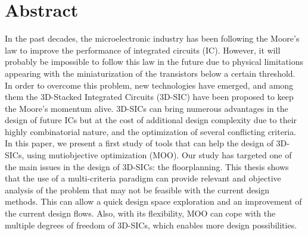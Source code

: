 \chapter{Abstract}

In the past decades, the microelectronic industry has been following the Moore's law to improve the performance of integrated circuits (IC). However, it will probably be impossible to follow this law in the future due to physical limitations appearing with the miniaturization of the transistors below a certain threshold. In order to overcome this problem, new technologies have emerged, and among them the 3D-Stacked Integrated Circuits (3D-SIC) have been proposed to keep the Moore's momentum alive. 3D-SICs can bring numerous advantages in the design of future ICs but at the cost of additional design complexity due to their highly combinatorial nature, and the optimization of several conflicting criteria. In this paper, we present a first study of tools that can help the design of 3D-SICs, using mutiobjective optimization (MOO). Our study has targeted one of the main issues in the design of 3D-SICs: the floorplanning. This thesis shows that the use of a multi-criteria paradigm can provide relevant and objective analysis of the problem that may not be feasible with the current design methods. This can allow a quick design space exploration and an improvement of the current design flows. Also, with its flexibility, MOO can cope with the multiple degrees of freedom of 3D-SICs, which enables more design possibilities.